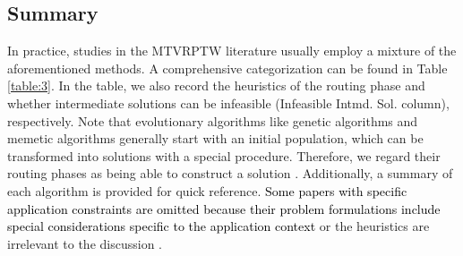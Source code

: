 \documentclass[11pt]{article}
\newcommand\add[1]{\textcolor{black}{#1}}
\begin{document}
\subsection{Summary}
In practice, studies in the MTVRPTW literature usually employ a mixture of the aforementioned methods.  A comprehensive categorization can be found in Table \ref{table:3}.  In the table, we also record the heuristics of the routing phase %
and whether intermediate solutions can be infeasible (Infeasible Intmd. Sol. column), respectively.  Note that evolutionary algorithms like genetic algorithms and memetic algorithms generally start with an initial population, which can be transformed into solutions with a special procedure.  Therefore, we regard their routing phases as being able to construct a solution \citep[e.g.,][]{cattaruzza2016multi, zhen2020multi}.  Additionally, a summary of each algorithm is provided for quick reference.  \add{Some papers with specific application constraints are omitted because their problem formulations include special considerations specific to the application context \citep[e.g.,][]{anaya2016biomedical, benkebir2019multi}} or the heuristics are irrelevant to the discussion \citep[e.g.,][which focuses on a comparison of single-trip and multiple-trip insertion heuristic, and is only applicable for the routing phase]{karoonsoontawong2015efficient}.
\end{document}

